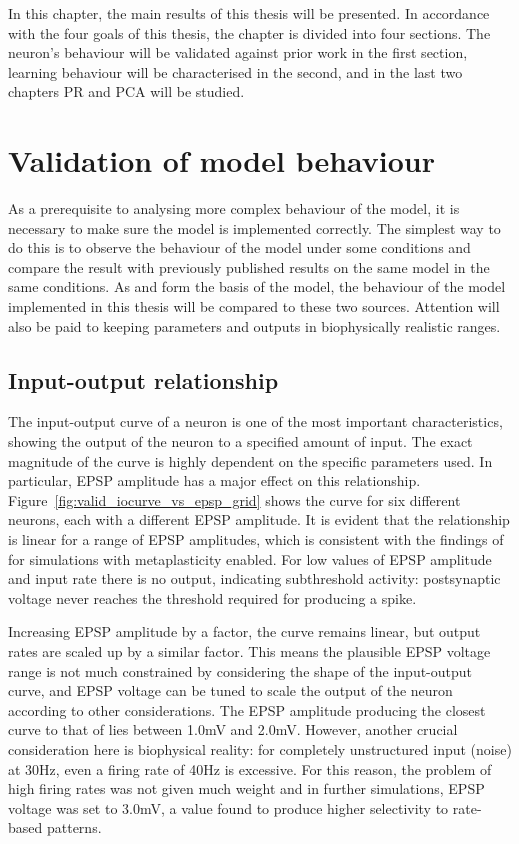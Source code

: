 \documentclass[a4paper,12pt]{report}
\theoremstyle{definition}
\begin{document}
In this chapter, the main results of this thesis will be presented. In accordance with the four goals of this thesis, the chapter is divided into four sections. The neuron's behaviour will be validated against prior work in the first section, learning behaviour will be characterised in the second, and in the last two chapters PR and PCA will be studied.

\section{Validation of model behaviour}
\label{sec:validation}

As a prerequisite to analysing more complex behaviour of the model, it is necessary to make sure the model is implemented correctly. The simplest way to do this is to observe the behaviour of the model under some conditions and compare the result with previously published results on the same model in the same conditions. As \cite{shouval2002unified} and \cite{yeung2004synaptic} form the basis of the model, the behaviour of the model implemented in this thesis will be compared to these two sources. Attention will also be paid to keeping parameters and outputs in biophysically realistic ranges.

\subsection{Input-output relationship}
\label{subsec:iocurve}

The input-output curve of a neuron is one of the most important characteristics, showing the output of the neuron to a specified amount of input. The exact magnitude of the curve is highly dependent on the specific parameters used. In particular, EPSP amplitude has a major effect on this relationship. 
Figure~\ref{fig:valid_iocurve_vs_epsp_grid} shows the curve for six different neurons, each with a different EPSP amplitude. It is evident that the relationship is linear for a range of EPSP amplitudes, which is consistent with the findings of \cite{yeung2004synaptic} for simulations with metaplasticity enabled. For low values of EPSP amplitude and input rate there is no output, indicating subthreshold activity: postsynaptic voltage never reaches the threshold required for producing a spike.

Increasing EPSP amplitude by a factor, the curve remains linear, but output rates are scaled up by a similar factor. This means the plausible EPSP voltage range is not much constrained by considering the shape of the input-output curve, and EPSP voltage can be tuned to scale the output of the neuron according to other considerations. The EPSP amplitude producing the closest curve to that of \cite{yeung2004synaptic} lies between 1.0mV and 2.0mV. However, another crucial consideration here is biophysical reality: for completely unstructured input (noise) at 30Hz, even a firing rate of 40Hz is excessive. For this reason, the problem of high firing rates was not given much weight and in further simulations, EPSP voltage was set to 3.0mV, a value found to produce higher selectivity to rate-based patterns.
\end{document}
